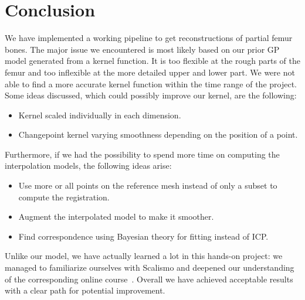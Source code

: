 \section{Conclusion}
\label{sec:conclusion}

We have implemented a working pipeline to get reconstructions of partial femur bones.
The major issue we encountered is most likely based on our prior GP model generated from a kernel function.
It is too flexible at the rough parts of the femur and too inflexible at the more detailed upper and lower part.
We were not able to find a more accurate kernel function within the time range of the project.
Some ideas discussed, which could possibly improve our kernel, are the following:
\begin{itemize}
  \item Kernel scaled individually in each dimension.
  \item Changepoint kernel varying smoothness depending on the position of a point.
\end{itemize}

Furthermore, if we had the possibility to spend more time on computing the interpolation models, the following ideas arise:
\begin{itemize}
  \item Use more or all points on the reference mesh instead of only a subset to compute the registration.
  \item Augment the interpolated model to make it smoother.
   \item Find correspondence using Bayesian theory for fitting instead of ICP.
\end{itemize}

Unlike our model, we have actually learned a lot in this hands-on project: we managed to familiarize ourselves with Scalismo and deepened our understanding of the corresponding online course~\cite{mooc2019statistical}.
Overall we have achieved acceptable results with a clear path for potential improvement.